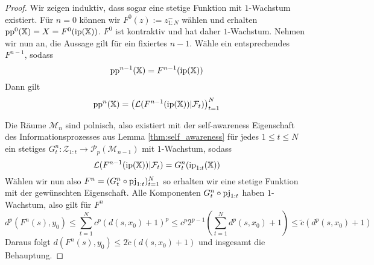     \begin{proof}
        Wir zeigen induktiv, dass sogar eine stetige Funktion mit $1$-Wachstum existiert. Für $n=0$ können wir $F^0(z) := z^-_{1:N}$ wählen und erhalten $\operatorname{pp}^0(\mathbb{X}) = X = F^0(\operatorname{ip}(\mathbb{X}))$. $F^0$ ist kontraktiv und hat daher $1$-Wachstum. Nehmen wir nun an, die Aussage gilt für ein fixiertes $n-1$. Wähle ein entsprechendes $F^{n-1}$, sodass 
        $$\operatorname{pp}^{n-1}(\mathbb{X}) = F^{n-1}(\operatorname{ip}(\mathbb{X}))$$
        Dann gilt 
        $$\operatorname{pp}^n(\mathbb{X}) = \left( \mathcal{L}(F^{n-1}(\operatorname{ip}(\mathbb{X})) \vert \mathcal{F}_t) \right)_{t=1}^{N}$$
        
        Die Räume $\mathcal{M}_n$ sind polnisch, also existiert mit der self-awareness Eigenschaft des Informationsprozesses aus Lemma \ref{thm:self_awareness} für jedes $1\leq t \leq N$ ein stetiges $G_t^n:\mathcal{Z}_{1:t} \rightarrow \mathcal{P}_p(\mathcal{M}_{n-1})$ mit $1$-Wachstum, sodass
        $$\mathcal{L}(F^{n-1}(\operatorname{ip}(\mathbb{X})) \vert \mathcal{F}_t) = G_t^n(\operatorname{ip}_{1:t}(\mathbb{X}))$$
        Wählen wir nun also $F^n=(G_t^n\circ \operatorname{pj}_{1:t})_{t=1}^N$ so erhalten wir eine stetige Funktion mit der gewünschten Eigenschaft. Alle Komponenten $G_t^n \circ \operatorname{pj}_{1:t}$ haben $1$-Wachstum, also gilt für $F^n$
        $$d^p(F^n(s), y_0) \leq \sum_{t=1}^N c^p (d(s, x_0)+1)^p \leq c^p2^{p-1} \left(\sum_{t=1}^N d^p(s,x_0) + 1\right) \leq \tilde{c}(d^p(s, x_0)+1)$$
        Daraus folgt $d(F^n(s), y_0) \leq 2\tilde{c} (d(s, x_0) + 1)$ und insgesamt die Behauptung.
    \end{proof}

